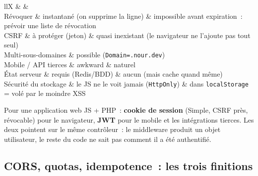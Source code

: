 \begin{tabz}{llX}
  \headrow {} \&  \&  \\
  \midrule
  R\'evoquer \& instantan\'e (on supprime la ligne) \& impossible avant expiration~: pr\'evoir une liste de r\'evocation \\
  CSRF \& \`a prot\'eger (jeton) \& quasi inexistant (le navigateur ne l'ajoute pas tout seul) \\
  Multi-sous-domaines \& possible (\verb|Domain=.nour.dev|) \\
  Mobile / API tierces \& awkward \& naturel \\
  \'Etat serveur \& requis (Redis/BDD) \& aucun (mais cache quand m\^eme) \\
  S\'ecurit\'e du stockage \& le JS ne le voit jamais (\verb|HttpOnly|) \& dans \verb|localStorage| = vol\'e par le moindre XSS \\
\end{tabz}

\begin{astuce}
Pour une application web JS + PHP~: \textbf{cookie de session} (Simple, CSRF pr\`es, r\'evocable) pour le
navigateur, \textbf{JWT} pour le mobile et les int\'egrations tierces. Les deux pointent sur le m\^eme
contr\^oleur~: le middleware produit un objet utilisateur, le reste du code ne sait pas comment il a \'et\'e
authentifi\'e.
\end{astuce}

\subsection{CORS, quotas, idempotence~: les trois finitions}

